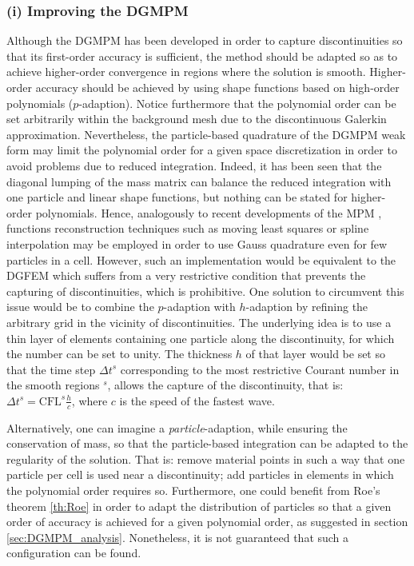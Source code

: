 \subsubsection*{(i) Improving the DGMPM}
Although the DGMPM has been developed in order to capture discontinuities so that its first-order accuracy is sufficient, the method should be adapted so as to achieve higher-order convergence in regions where the solution is smooth.
Higher-order accuracy should be achieved by using shape functions based on high-order polynomials ($p$-adaption).
Notice furthermore that the polynomial order can be set arbitrarily within the background mesh due to the discontinuous Galerkin approximation.
Nevertheless, the particle-based quadrature of the DGMPM weak form may limit the polynomial order for a given space discretization in order to avoid problems due to reduced integration.
Indeed, it has been seen that the diagonal lumping of the mass matrix can balance the reduced integration with one particle and linear shape functions, but nothing can be stated for higher-order polynomials.
Hence, analogously to recent developments of the MPM \cite{MPM_BSpline1,MPM_BSpline2,IMPM}, functions reconstruction techniques such as moving least squares or spline interpolation may be employed in order to use Gauss quadrature even for few particles in a cell.
However, such an implementation would be equivalent to the DGFEM which suffers from a very restrictive  condition that prevents the capturing of discontinuities, which is prohibitive.
One solution to circumvent this issue would be to combine the $p$-adaption with $h$-adaption by refining the arbitrary grid in the vicinity of discontinuities.
The underlying idea is to use a thin layer of elements containing one particle along the discontinuity, for which the  number can be set to unity.
The thickness $h$ of that layer would be set so that the time step $\Delta t^s$ corresponding to the most restrictive Courant number in the smooth regions $^s$, allows the capture of the discontinuity, that is: $\Delta t^s = \text{CFL}^s \frac{h}{c}$, where $c$ is the speed of the fastest wave.

Alternatively, one can imagine a \textit{particle}-adaption, while ensuring the conservation of mass, so that the particle-based integration can be adapted to the regularity of the solution. 
That is: remove material points in such a way that one particle per cell is used near a discontinuity; add particles in elements in which the polynomial order requires so. 
Furthermore, one could benefit from Roe's theorem \ref{th:Roe} in order to adapt the distribution of particles so that a given order of accuracy is achieved for a given polynomial order, as suggested in section \ref{sec:DGMPM_analysis}.
Nonetheless, it is not guaranteed that such a configuration can be found.

